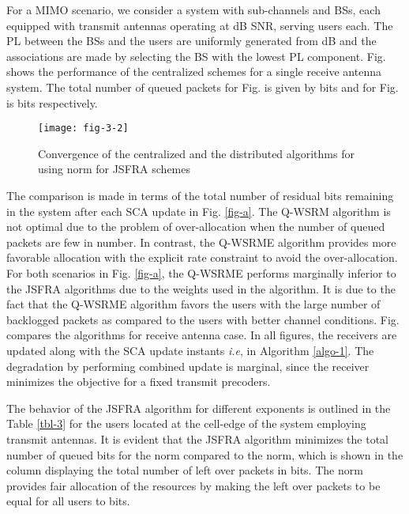 For a \ac{MIMO} scenario, we consider a system with  sub-channels and  \acp{BS}, each equipped with  transmit antennas operating at dB \ac{SNR}, serving  users each. The \ac{PL} between the \acp{BS} and the users are uniformly generated from \me{[0,-3]} dB and the associations are made by selecting the \ac{BS} with the lowest \ac{PL} component. Fig.  shows the performance of the centralized schemes for a single receive antenna system. The total number of queued packets for Fig.  is given by  bits and for Fig.  is  bits respectively.
\begin{figure}
	\centering
	\texttt{[image: fig-3-2]}
	\caption{Convergence of the centralized and the distributed algorithms for  using  norm for \ac{JSFRA} schemes}
	\label{fig-d}
\end{figure}

The comparison is made in terms of the total number of residual bits remaining in the system after each \ac{SCA} update in Fig. \ref{fig-a}. The \ac{Q-WSRM} algorithm is not optimal due to the problem of over-allocation when the number of queued packets are few in number. In contrast, the \ac{Q-WSRME} algorithm provides more favorable allocation with the explicit rate constraint to avoid the over-allocation. For both scenarios in Fig. \ref{fig-a}, the \ac{Q-WSRME} performs marginally inferior to the \ac{JSFRA} algorithms due to the weights used in the algorithm. It is due to the fact that the \ac{Q-WSRME} algorithm favors the users with the large number of backlogged packets as compared to the users with better channel conditions. Fig.  compares the algorithms for  receive antenna case. In all figures, the receivers are updated along with the \ac{SCA} update instants \textit{i.e},  in Algorithm \ref{algo-1}. The degradation by performing combined update is marginal, since the receiver minimizes the objective for a fixed transmit precoders.

The behavior of the \ac{JSFRA} algorithm for different exponents  is outlined in the Table \ref{tbl-3} for the users located at the cell-edge of the system employing  transmit antennas. It is evident that the \ac{JSFRA} algorithm minimizes the total number of queued bits for the  norm compared to the  norm, which is shown in the column displaying the total number of left over packets \me{\chi} in bits. The \me{\ell_{\infty}} norm provides fair allocation of the resources by making the left over packets to be equal for all users to  bits.
